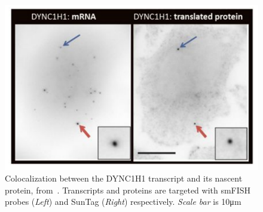 

\begin{figure}[h]
    \centering
    \includegraphics[width=\textwidth]{figures/chapter5/translation_factory}
    \caption{Colocalization between the DYNC1H1 transcript and its nascent protein, from~\cite{pichon_visualization_2016}.
	Transcripts and proteins are targeted with smFISH probes (\textit{Left}) and SunTag (\textit{Right}) respectively.
	\textit{Scale bar} is 10μm}
    \label{fig:translation_factory}
\end{figure}

